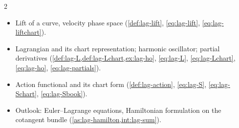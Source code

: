 \begin{paracol}{2}
\begin{keyconcepts}
\begin{itemize}
  \item Lift of a curve, velocity phase space (\cref{def:lag-lift}, \eqref{eq:lag-lift}, \eqref{eq:lag-liftchart}).
  \item Lagrangian and its chart representation; harmonic oscillator; partial derivatives (\cref{def:lag-L,def:lag-Lchart,ex:lag-ho}, \eqref{eq:lag-L}, \eqref{eq:lag-Lchart}, \eqref{eq:lag-ho}, \eqref{eq:lag-partials}).
  \item Action functional and its chart form (\cref{def:lag-action}, \eqref{eq:lag-S}, \eqref{eq:lag-Schart}, \eqref{eq:lag-Sbook}).
  \item Outlook: Euler--Lagrange equations, Hamiltonian formulation on the cotangent bundle (\cref{as:lag-hamilton,int:lag-sum}).
\end{itemize}
\end{keyconcepts}

\flushside
\end{paracol}
